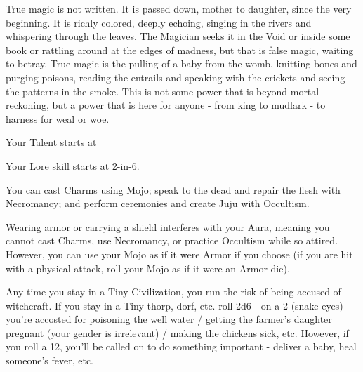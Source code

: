 {  %


  True magic is not written. It is passed down, mother to daughter, since the very beginning.  It is richly colored, deeply echoing, singing in the rivers and whispering through the leaves.  The Magician seeks it in the Void or inside some book or rattling around at the edges of madness, but that is false magic, waiting to betray.  True magic is the pulling of a baby from the womb, knitting bones and purging poisons, reading the entrails and speaking with the crickets and seeing the patterns in the smoke.  This is not some power that is beyond mortal reckoning, but a power that is here for anyone - from king to mudlark - to harness for weal or woe.


  Your Talent starts at \DCUP

  Your Lore skill starts at 2-in-6. 

  You can cast Charms using Mojo; speak to the dead and repair the flesh with Necromancy; and perform ceremonies and create Juju with Occultism.  

  Wearing armor or carrying a shield interferes with your Aura, meaning you cannot cast Charms, use Necromancy, or practice Occultism while so attired.  However, you can use your Mojo as if it were Armor if you choose (if you are hit with a physical attack, roll your Mojo \UD as if it were an Armor die).


  Any time you stay in a Tiny Civilization, you run the risk of being accused of witchcraft.  If you stay in a Tiny thorp, dorf, etc. roll 2d6 - on a 2 (snake-eyes) you're accosted for poisoning the well water / getting the farmer's daughter pregnant (your gender is irrelevant) / making the chickens sick, etc.  However, if you roll a 12, you'll be called on to do something important - deliver a baby, heal someone's fever, etc.

}
